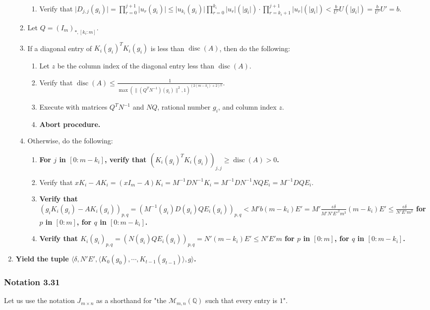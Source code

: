 \documentclass[twocolumn]{article}
\DeclareMathOperator{\disc}{disc}
\newcommand{\notation}[1]{\subsubsection*{Notation #1}}
\newcommand{\procedurehr}[2][]{\hyperref[sec:procedure #2]{\ifthenelse{\equal{#1}{}}{procedure #2}{#1}}}
\begin{document}
\begin{enumerate}
\begin{enumerate}
\begin{enumerate}
							\item Verify that $\lvert D_{j,j}(g_i)\rvert=\prod_{r=0}^{j+1}\lvert u_r(g_i)\rvert\le\lvert u_{k_i}(g_i)\rvert\prod_{r=0}^{k_i}\lvert u_r\rvert(\lvert g_i\rvert)\cdot\prod_{r=k_i+1}^{j+1}\lvert u_{r}\rvert(\lvert g_i\rvert)<\frac{b}{U'}U(\lvert g_i\rvert)=\frac{b}{U'}U'=b$.
						\end{enumerate}
						\item Let $Q=(I_m)_{*,[k_i:m]}$.
						\item If a diagonal entry of ${K_i(g_i)}^TK_i(g_i)$ is less than $\disc(A)$, then do the following:
						\begin{enumerate}
							\item Let $z$ be the column index of the diagonal entry less than $\disc(A)$.
							\item Verify that $\disc(A)\le\frac{1}{\max(\lVert (Q^TN^{-1})(g_i)\rVert^2,1)^{(2(m-k_i)+2)!!}}$.
							\item Execute \procedurehr{3.78} with matrices $Q^TN^{-1}$ and $NQ$, rational number $g_i$, and column index $z$.
							\item \textbf{Abort procedure.}
						\end{enumerate}
						\item Otherwise, do the following:
						\begin{enumerate}
							\item \textbf{For $j$ in $[0:m-k_i]$, verify that $({K_i(g_i)}^TK_i(g_i))_{j,j}\ge \disc(A)>0$.}
							\item Verify that $xK_i-AK_i=(xI_m-A)K_i=M^{-1}DN^{-1}K_i=M^{-1}DN^{-1}NQE_i=M^{-1}DQE_i$.
							\item \textbf{Verify that $(g_iK_i(g_i)-AK_i(g_i))_{p,q}=(M^{-1}(g_i)D(g_i)QE_i(g_i))_{p,q}<M'b(m-k_i)E'=M'\frac{\epsilon\delta}{M'N'E'^2m^3}(m-k_i)E'\le\frac{\epsilon\delta}{N'E'm^2}$ for $p$ in $[0:m]$, for $q$ in $[0:m-k_i]$.}
							\item \textbf{Verify that $K_i(g_i)_{p,q}=(N(g_i)QE_i(g_i))_{p,q}=N'(m-k_i)E'\le N'E'm$ for $p$ in $[0:m]$, for $q$ in $[0:m-k_i]$.}
						\end{enumerate}
					\end{enumerate}
					\item \textbf{Yield the tuple $\langle\delta,N'E',\langle K_0(g_0),\cdots,K_{t-1}(g_{t-1})\rangle,g\rangle$.}
				\end{enumerate}
		\notation{3.31}
			Let us use the notation $J_{m\times n}$ as a shorthand for "the $\mathcal{M}_{m,n}(\mathbb{Q})$ such that every entry is $1$".
\end{document}

